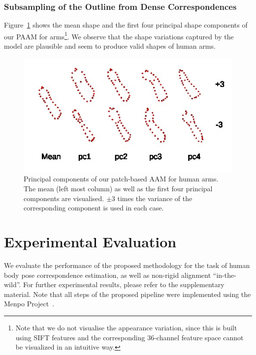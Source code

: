 \subsubsection*{Subsampling of the Outline from Dense Correspondences}
\label{sec:sparsesample}

Figure~\ref{fig:paam_sm} shows the mean shape and the first four principal shape components of our PAAM for arms\footnote{Note that we do not visualise the appearance variation, since this is built using SIFT features and the corresponding 36-channel feature space cannot be visualized in an intuitive way.}. We observe that the shape variations captured by the model are plausible and seem to produce valid shapes of human arms.

\begin{figure}
    \centering
    \includegraphics[width=\columnwidth]{resources/Annotation_Correction/Suplementory_Meterial/HandSMPAAM/handsmpaam}
    \caption{Principal components of our patch-based AAM for human arms.  The mean (left most column) as well as the first four principal components are visualised. $\pm 3$ times the variance of the corresponding component is used in each case.}
    \label{fig:paam_sm}
\end{figure}

\section{Experimental Evaluation}

We evaluate the performance of the proposed methodology for the task of human body pose correspondence estimation, as well as non-rigid alignment ``in-the-wild''. For further experimental results, please refer to the supplementary material. Note that all steps of the proposed pipeline were implemented using the Menpo Project~\cite{menpo14}.

